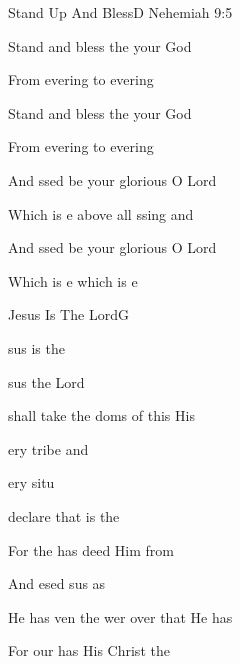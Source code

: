 \documentclass[a5paper,11pt]{book}
\newcommand{\RevDate}{\today}
\newcommand{\NotCCLIed}{\relax}
\begin{document}
\WBPageBrk
\begin{song}{Stand Up And Bless}{D}
  {}
  {}
  {Nehemiah 9:5}
  {\NotCCLIed}

  \renewcommand{\RevDate}{February~11,~1993}

  \begin{SBOpGroup}
    Stand  and bless the  your God
    
    From evering to evering
    
    Stand  and bless the  your God
    
    From evering to evering
  \end{SBOpGroup}

  \begin{SBChorus}
    And ssed be your glorious  O Lord

    Which is e above all ssing and 

    And ssed be your glorious  O Lord

    Which is e which is e
  \end{SBChorus}
\end{song}


\begin{song}{Jesus Is The Lord}{G}
  {}
  {}
  {}
  {\NotCCLIed}

  \renewcommand{\RevDate}{February~11,~1993}

  \begin{SBOpGroup}
    sus is the 
    
    sus the Lord 
    
     shall take the doms of this   His  
    
    ery tribe and 
    
    ery situ
    
     declare that  is the  
  \end{SBOpGroup}

  \begin{SBChorus}
    For the    has deed Him from 

    And esed sus as  

    He has ven  the wer over  that He has 

    For our  has  His Christ the 
  \end{SBChorus}
\end{song}
\end{document}
